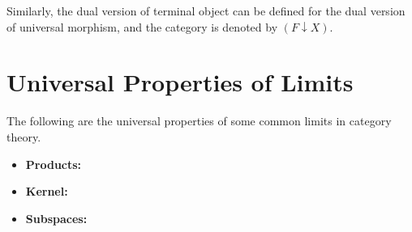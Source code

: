 \documentclass[
	11pt, %
	fleqn, %
	a4paper, %
]{LegrandOrangeBook}
\renewcommand{\ker}[1]{\mathsf{Ker}(#1)} %
\newcommand{\quotient}[2]{#1/\, #2} %
\begin{document}
\begin{appendices}
\begin{remark}
    Similarly, the dual version of terminal object can be defined for the dual version of universal morphism, and the category is denoted by $(F \downarrow X)$.
\end{remark}

\section{Universal Properties of Limits}

The following are the universal properties of some common limits in category theory.

\begin{itemize}
    \item \textbf{Products:}
    \begin{center}
    \end{center}

    \item \textbf{Kernel:}
    \begin{center}
    \end{center}

    \item \textbf{Subspaces:}
    \begin{center}
    \end{center}
\end{itemize}

\newpage


\end{appendices}
\end{document}
